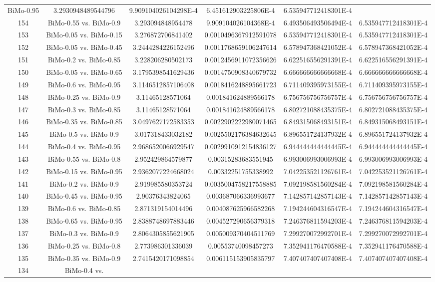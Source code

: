 \documentclass[a4paper,10pt]{article}
\begin{document}
\begin{landscape}
\begin{table}[!htp]
\begin{tabular}{cccccc}
BiMo-0.95&3.2930948489544796&9.909104026104298E-4&6.451612903225806E-4&6.535947712418301E-4\\154&BiMo-0.55 vs. BiMo-0.9&3.293094848954478&9.909104026104368E-4&6.493506493506494E-4&6.535947712418301E-4\\153&BiMo-0.05 vs. BiMo-0.15&3.276872706841402&0.0010496367912591078&6.535947712418301E-4&6.535947712418301E-4\\152&BiMo-0.05 vs. BiMo-0.45&3.2444284226152496&0.0011768659106247614&6.578947368421052E-4&6.578947368421052E-4\\151&BiMo-0.2 vs. BiMo-0.85&3.228206280502173&0.0012456911072356626&6.622516556291391E-4&6.622516556291391E-4\\150&BiMo-0.05 vs. BiMo-0.65&3.1795398541629436&0.0014750908340679732&6.666666666666668E-4&6.666666666666668E-4\\149&BiMo-0.6 vs. BiMo-0.95&3.1146512857106408&0.0018416248895661723&6.711409395973155E-4&6.711409395973155E-4\\148&BiMo-0.25 vs. BiMo-0.9&3.11465128571064&0.001841624889566178&6.756756756756757E-4&6.756756756756757E-4\\147&BiMo-0.3 vs. BiMo-0.85&3.11465128571064&0.001841624889566178&6.802721088435375E-4&6.802721088435375E-4\\146&BiMo-0.35 vs. BiMo-0.85&3.0497627172583353&0.0022902222980071465&6.849315068493151E-4&6.849315068493151E-4\\145&BiMo-0.5 vs. BiMo-0.9&3.017318433032182&0.0025502176384632645&6.896551724137932E-4&6.896551724137932E-4\\144&BiMo-0.4 vs. BiMo-0.95&2.9686520066929547&0.0029910912154836127&6.944444444444445E-4&6.944444444444445E-4\\143&BiMo-0.55 vs. BiMo-0.8&2.952429864579877&0.00315283683551945&6.993006993006993E-4&6.993006993006993E-4\\142&BiMo-0.15 vs. BiMo-0.95&2.9362077224668024&0.00332251755338992&7.042253521126761E-4&7.042253521126761E-4\\141&BiMo-0.2 vs. BiMo-0.9&2.919985580353724&0.0035004758217558885&7.092198581560284E-4&7.092198581560284E-4\\140&BiMo-0.45 vs. BiMo-0.95&2.90376343824065&0.003687066336993677&7.142857142857143E-4&7.142857142857143E-4\\139&BiMo-0.6 vs. BiMo-0.85&2.871319154014496&0.004087625966582268&7.194244604316547E-4&7.194244604316547E-4\\138&BiMo-0.65 vs. BiMo-0.95&2.8388748697883446&0.004527290656379318&7.246376811594203E-4&7.246376811594203E-4\\137&BiMo-0.3 vs. BiMo-0.9&2.8064305855621905&0.005009370404511769&7.299270072992701E-4&7.299270072992701E-4\\136&BiMo-0.25 vs. BiMo-0.8&2.773986301336039&0.00553740098457273&7.352941176470588E-4&7.352941176470588E-4\\135&BiMo-0.35 vs. BiMo-0.9&2.7415420171098854&0.006115153905835797&7.407407407407408E-4&7.407407407407408E-4\\134&BiMo-0.4 vs. 
\end{tabular}
\end{table}
\end{landscape}
\end{document}

